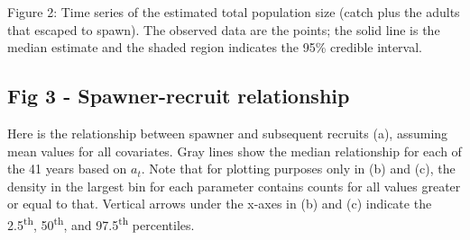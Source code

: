 \documentclass[
  11pt,
]{article}
\begin{document}
Figure 2: Time series of the estimated total population size (catch plus
the adults that escaped to spawn). The observed data are the points; the
solid line is the median estimate and the shaded region indicates the
95\% credible interval.

\hypertarget{fig-3---spawner-recruit-relationship}{%
\subsection{Fig 3 - Spawner-recruit
relationship}\label{fig-3---spawner-recruit-relationship}}

Here is the relationship between spawner and subsequent recruits (a),
assuming mean values for all covariates. Gray lines show the median
relationship for each of the 41 years based on \(a_t\). Note that for
plotting purposes only in (b) and (c), the density in the largest bin
for each parameter contains counts for all values greater or equal to
that. Vertical arrows under the x-axes in (b) and (c) indicate the
2.5\textsuperscript{th}, 50\textsuperscript{th}, and
97.5\textsuperscript{th} percentiles.
\end{document}
